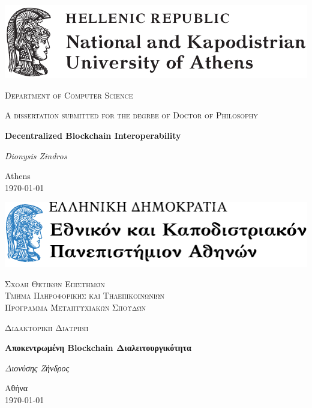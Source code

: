 \begin{titlepage}
  \centering
  \includegraphics[width=\textwidth]{chapters/preface/figures/uoa.pdf}\par\vspace{1cm}
  {\scshape\Large Department of Computer Science\par}
  \vspace{1cm}
  {\scshape A dissertation submitted for the degree of Doctor of Philosophy\par}
  \vspace{1cm}
  {\huge\bfseries Decentralized Blockchain Interoperability\par}
  \vspace{2cm}
  {\Large\itshape Dionysis
                  Zindros\par}
	\vfill
	{\large Athens\\\today\par}
\end{titlepage}
\newpage\null\thispagestyle{empty}\newpage

\ifuniversity
\begin{titlepage}
  \setcounter{page}{3}
  \centering
  \includegraphics[width=\textwidth]{chapters/preface/figures/uoa-greek.pdf}\par\vspace{1cm}
  {\scshape\Large
  \ifuniversity
  Σχολή Θετικών Επιστημών\\
  \fi
  Τμήμα Πληροφορικής και Τηλεπικοινωνιών
  \ifuniversity
  \\
  Πρόγραμμα Μεταπτυχιακών Σπουδών
  \fi
  \par}
  \vspace{1cm}
  {\scshape Διδακτορική Διατριβή\par}
  \vspace{1cm}
  {\huge\bfseries Αποκεντρωμένη Blockchain Διαλειτουργικότητα \par}
  \vspace{2cm}
  {\Large\itshape Διονύσης
                  Ζήνδρος\par}
	\vfill
	{\large Αθήνα\\\textgreek{\today}\par}
\end{titlepage}
\newpage\null\thispagestyle{empty}\newpage
\fi
